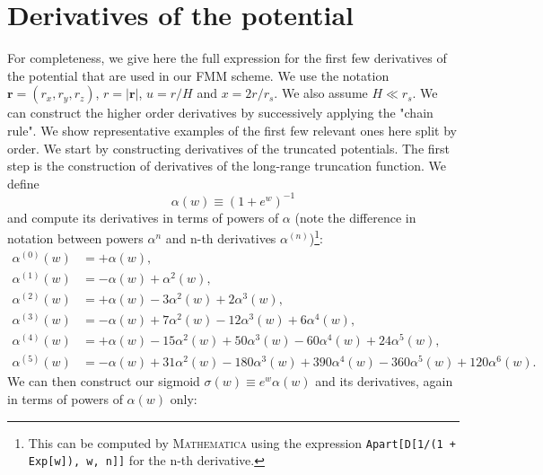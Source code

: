 \section{Derivatives of the potential}
\label{sec:pot_derivatives}

For completeness, we give here the full expression for the first few
derivatives of the potential that are used in our FMM scheme. We use
the notation $\mathbf{r}=(r_x, r_y, r_z)$, $r = |\mathbf{r}|$, $u=r/H$
and $x=2r/r_s$. We also assume $H \ll r_s$. We can construct the
higher order derivatives by successively applying the "chain rule". We
show representative examples of the first few relevant ones here split
by order. We start by constructing derivatives of the truncated
potentials. The first step is the construction of derivatives of the
long-range truncation function. We define
\begin{equation}
  \alpha(w) \equiv \left(1 + e^w\right)^{-1} \nonumber
\end{equation}
and compute its derivatives in terms of powers of $\alpha$ (note the
difference in notation between powers $\alpha^n$ and n-th derivatives
$\alpha^{(n)}$)\footnote{This can be computed by \textsc{Mathematica}
  using the expression \texttt{Apart[D[1/(1 + Exp[w]), {w, n}]]} for
  the n-th derivative.}:
\begin{align}
  \alpha^{(0)}(w) &= +\alpha(w), \nonumber\\
  \alpha^{(1)}(w) &= -\alpha(w) + \alpha^2(w),  \nonumber\\
  \alpha^{(2)}(w) &= +\alpha(w) - 3\alpha^2(w) + 2\alpha^3(w),  \nonumber\\
  \alpha^{(3)}(w) &= -\alpha(w) + 7\alpha^2(w) - 12\alpha^3(w) + 6\alpha^4(w),   \nonumber\\
  \alpha^{(4)}(w) &= +\alpha(w) - 15\alpha^2(w) + 50\alpha^3(w) - 60\alpha^4(w) + 24\alpha^5(w),    \nonumber\\
  \alpha^{(5)}(w) &= -\alpha(w) + 31\alpha^2(w) -180\alpha^3(w) + 390\alpha^4(w) -360\alpha^5(w) + 120\alpha^6(w).\nonumber                                      
\end{align}
We can then construct our sigmoid $\sigma(w) \equiv e^w\alpha(w)$ and
its derivatives, again in terms of powers of $\alpha(w)$ only:
